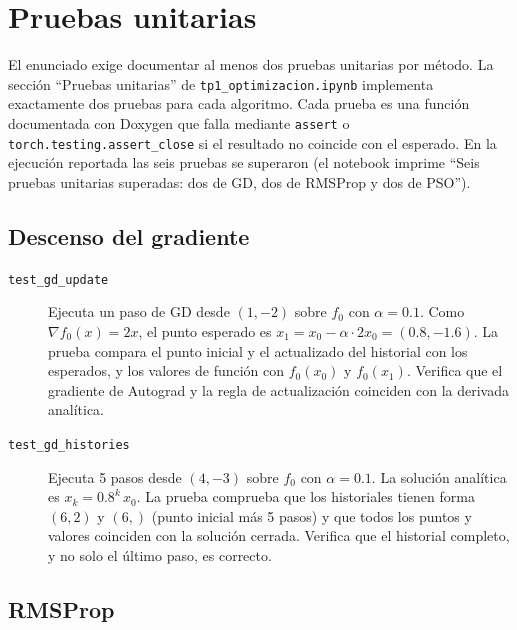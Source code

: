 \section{Pruebas unitarias}
\label{sec:pruebas}

El enunciado exige documentar al menos dos pruebas unitarias por método.
La sección ``Pruebas unitarias'' de
\texttt{tp1\_optimizacion.ipynb} implementa exactamente dos
pruebas para cada algoritmo. Cada prueba es una función documentada con
Doxygen que falla mediante \texttt{assert} o
\texttt{torch.testing.assert\_close} si el resultado no coincide con el
esperado. En la ejecución reportada las seis pruebas se superaron (el
notebook imprime ``Seis pruebas unitarias superadas: dos de GD, dos de
RMSProp y dos de PSO'').

\subsection{Descenso del gradiente}

\begin{description}
    \item[\texttt{test\_gd\_update}] Ejecuta un paso de GD desde
    $(1,-2)$ sobre $f_0$ con $\alpha=0.1$. Como $\nabla f_0(x)=2x$, el punto
    esperado es $x_1=x_0-\alpha\cdot2x_0=(0.8,-1.6)$. La prueba compara el
    punto inicial y el actualizado del historial con los esperados, y los
    valores de función con $f_0(x_0)$ y $f_0(x_1)$. Verifica que el
    gradiente de Autograd y la regla de actualización coinciden con la
    derivada analítica.
    \item[\texttt{test\_gd\_histories}] Ejecuta 5 pasos desde $(4,-3)$
    sobre $f_0$ con $\alpha=0.1$. La solución analítica es
    $x_k=0.8^k\,x_0$. La prueba comprueba que los historiales tienen forma
    $(6,2)$ y $(6,)$ (punto inicial más 5 pasos) y que todos los puntos y
    valores coinciden con la solución cerrada. Verifica que el historial
    completo, y no solo el último paso, es correcto.
\end{description}

\subsection{RMSProp}

